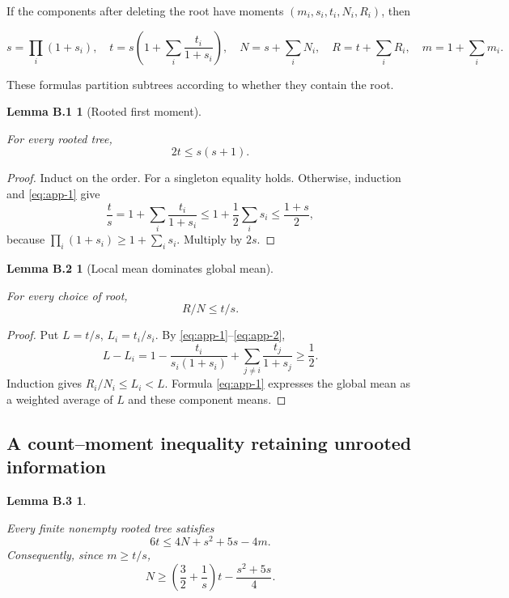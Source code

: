 \documentclass[11pt,reqno]{amsart}
\theoremstyle{plain}
\newtheorem*{applemmaone}{Lemma B.1}
\newtheorem*{applemmatwo}{Lemma B.2}
\newtheorem*{applemmathree}{Lemma B.3}
\begin{document}
If the components after deleting the root have moments \((m_i,s_i,t_i,N_i,R_i)\), then

\[
s=\prod_i(1+s_i),\quad
 t=s\left(1+\sum_i\frac{t_i}{1+s_i}\right),\quad
 N=s+\sum_iN_i,\quad R=t+\sum_iR_i,\quad m=1+\sum_i m_i.
\tag{B.1}\label{eq:app-1}
\]

These formulas partition subtrees according to whether they contain the root.

\begin{applemmaone}[Rooted first moment]\label{lem:app-1}

For every rooted tree, \[
2t\le s(s+1).
\tag{B.2}\label{eq:app-2}
\]

\end{applemmaone}

\begin{proof} Induct on the order. For a singleton equality holds. Otherwise, induction and \eqref{eq:app-1} give \[
\frac ts=1+\sum_i\frac{t_i}{1+s_i}
\le1+\frac12\sum_i s_i
\le\frac{1+s}{2},
\] because \(\prod_i(1+s_i)\ge1+\sum_i s_i\). Multiply by \(2s\). \end{proof}

\begin{applemmatwo}[Local mean dominates global mean]\label{lem:app-2}

For every choice of root, \[
R/N\le t/s.
\tag{B.3}\label{eq:app-3}
\]

\end{applemmatwo}

\begin{proof} Put \(L=t/s\), \(L_i=t_i/s_i\). By \eqref{eq:app-1}--\eqref{eq:app-2}, \[
L-L_i
=1-\frac{t_i}{s_i(1+s_i)}
 +\sum_{j\ne i}\frac{t_j}{1+s_j}\ge\frac12.
\] Induction gives \(R_i/N_i\le L_i<L\). Formula \eqref{eq:app-1} expresses the global mean as a weighted average of \(L\) and these component means. \end{proof}

\subsection{A count--moment inequality retaining unrooted information}\label{b.2.-a-countmoment-inequality-retaining-unrooted-information}

\begin{applemmathree}\label{lem:app-3}

Every finite nonempty rooted tree satisfies \[
\boxed{6t\le4N+s^2+5s-4m.}
\tag{B.4}\label{eq:app-4}
\] Consequently, since \(m\ge t/s\), \[
\boxed{
N\ge\left(\frac32+\frac1s\right)t-\frac{s^2+5s}{4}.
}
\tag{B.5}\label{eq:app-5}
\]

\end{applemmathree}
\end{document}
